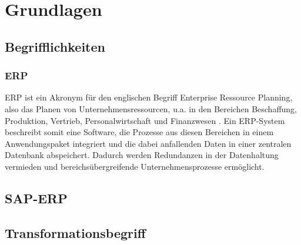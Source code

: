 \section{Grundlagen}
\subsection{Begrifflichkeiten}
\subsubsection{ERP}
ERP ist ein Akronym für den englischen Begriff \glqq{}Enterprise Ressource Planning\grqq{}, also das Planen von Unternehmensressourcen, u.a. in den Bereichen Beschaffung, Produktion, Vertrieb, Personalwirtschaft und Finanzwesen \citep[Vgl.][]{wi-buch}. Ein ERP-System beschreibt somit eine Software, die Prozesse aus diesen Bereichen in einem Anwendungspaket integriert und die dabei anfallenden Daten in einer zentralen Datenbank abspeichert. Dadurch werden Redundanzen in der Datenhaltung vermieden und bereichsübergreifende Unternehmensprozesse ermöglicht.

\subsection{SAP-ERP}
\subsection{Transformationsbegriff}
